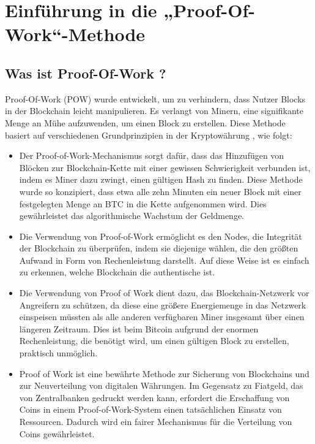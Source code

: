 \documentclass[ngerman]{scrreprt}
\begin{document}
\chapter[Theoretische Seite der Proof-Of-Work-Methode]{Einführung in die „Proof-Of-Work“-Methode}	

\section{Was ist Proof-Of-Work ?}
Proof-Of-Work (POW) wurde entwickelt, um zu verhindern, dass Nutzer Blocks in der Blockchain leicht manipulieren. Es verlangt von Minern, eine signifikante Menge an Mühe aufzuwenden, um einen Block zu erstellen. Diese Methode basiert auf verschiedenen Grundprinzipien in der Kryptowährung \cite{proof_of_work_wikipedia}, wie folgt:

\begin{itemize}
	\item{Der Proof-of-Work-Mechanismus sorgt dafür, dass das Hinzufügen von Blöcken zur Blockchain-Kette mit einer gewissen Schwierigkeit verbunden ist, indem es Miner dazu zwingt, einen gültigen Hash zu finden. Diese Methode wurde so konzipiert, dass etwa alle zehn Minuten ein neuer Block mit einer festgelegten Menge an BTC in die Kette aufgenommen wird. Dies gewährleistet das algorithmische Wachstum der Geldmenge. \cite{btc-echo-proof-of-work}}
	\item{Die Verwendung von Proof-of-Work ermöglicht es den Nodes, die Integrität der Blockchain zu überprüfen, indem sie diejenige wählen, die den größten Aufwand in Form von Rechenleistung darstellt. Auf diese Weise ist es einfach zu erkennen, welche Blockchain die authentische ist.}
	\item{Die Verwendung von Proof of Work dient dazu, das Blockchain-Netzwerk vor Angreifern zu schützen, da diese eine größere Energiemenge in das Netzwerk einspeisen müssten als alle anderen verfügbaren Miner insgesamt über einen längeren Zeitraum. Dies ist beim Bitcoin aufgrund der enormen Rechenleistung, die benötigt wird, um einen gültigen Block zu erstellen, praktisch unmöglich.}
	\item{Proof of Work ist eine bewährte Methode zur Sicherung von Blockchains und zur Neuverteilung von digitalen Währungen. Im Gegensatz zu Fiatgeld, das von Zentralbanken gedruckt werden kann, erfordert die Erschaffung von Coins in einem Proof-of-Work-System einen tatsächlichen Einsatz von Ressourcen. Dadurch wird ein fairer Mechanismus für die Verteilung von Coins gewährleistet. \cite{btc-echo-proof-of-work}}
\end{itemize}
\end{document}
